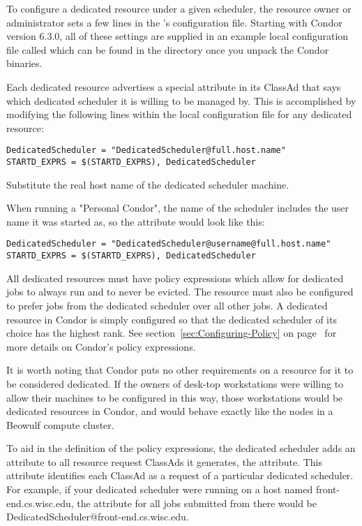 To configure a dedicated resource under a given scheduler, the
resource owner or administrator sets a few lines in the
's configuration file.
Starting with Condor version 6.3.0, all of these settings are supplied
in an example local configuration file called
 which can be found in
the  directory once you unpack the Condor binaries.

Each dedicated resource advertises a special attribute in its ClassAd
that says which dedicated scheduler it is willing to be managed by.
This is accomplished by modifying the following lines within the local
configuration file for any dedicated resource:

\begin{verbatim}
DedicatedScheduler = "DedicatedScheduler@full.host.name"
STARTD_EXPRS = $(STARTD_EXPRS), DedicatedScheduler
\end{verbatim}

Substitute the real host name of the dedicated scheduler
machine. 

When running a "Personal Condor", the name of the scheduler includes
the user name it was started as, so the attribute would look
like this:

\begin{verbatim}
DedicatedScheduler = "DedicatedScheduler@username@full.host.name"
STARTD_EXPRS = $(STARTD_EXPRS), DedicatedScheduler
\end{verbatim}

All dedicated resources must have policy expressions which allow for
dedicated jobs to always run and to never be evicted.
The resource must also be configured to prefer jobs from the dedicated 
scheduler over all other jobs.
A dedicated resource in Condor is simply configured so that the
dedicated scheduler of its choice has the highest rank.
See section~\ref{sec:Configuring-Policy} on
page~\pageref{sec:Configuring-Policy} 
for more details on Condor's policy expressions. 

It is worth noting that Condor puts no other requirements on a
resource for it to be considered dedicated.  
If the owners of desk-top workstations were willing to allow their
machines to be configured in this way, those workstations would be
dedicated resources in Condor, and would behave exactly like the nodes
in a Beowulf compute cluster.

To aid in the definition of the policy expressions, the dedicated
scheduler adds an attribute to all resource request ClassAds it
generates, the  attribute.
This attribute identifies each ClassAd as a request of a particular
dedicated scheduler.
For example, if your dedicated scheduler were running on a host named
front-end.cs.wisc.edu, the  attribute for all jobs
submitted from there would be
DedicatedScheduler@front-end.cs.wisc.edu. 

